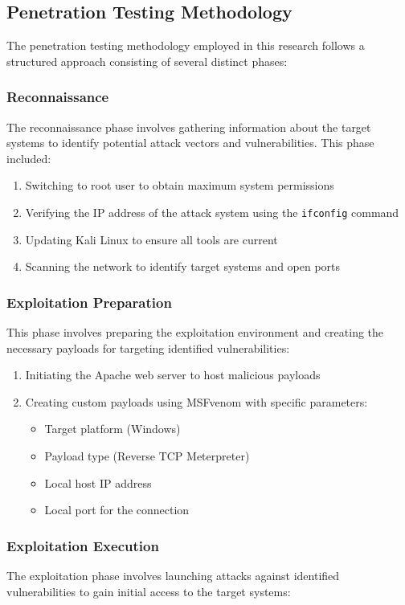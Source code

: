 \documentclass[journal,twoside]{IEEEtran}
\begin{document}
\subsection{Penetration Testing Methodology}
The penetration testing methodology employed in this research follows a structured approach consisting of several distinct phases:

\subsubsection{Reconnaissance}
The reconnaissance phase involves gathering information about the target systems to identify potential attack vectors and vulnerabilities. This phase included:

\begin{enumerate}
    \item Switching to root user to obtain maximum system permissions
    \item Verifying the IP address of the attack system using the \texttt{ifconfig} command
    \item Updating Kali Linux to ensure all tools are current
    \item Scanning the network to identify target systems and open ports
\end{enumerate}

\subsubsection{Exploitation Preparation}
This phase involves preparing the exploitation environment and creating the necessary payloads for targeting identified vulnerabilities:

\begin{enumerate}
    \item Initiating the Apache web server to host malicious payloads
    \item Creating custom payloads using MSFvenom with specific parameters:
    \begin{itemize}
        \item Target platform (Windows)
        \item Payload type (Reverse TCP Meterpreter)
        \item Local host IP address
        \item Local port for the connection
    \end{itemize}
\end{enumerate}

\subsubsection{Exploitation Execution}
The exploitation phase involves launching attacks against identified vulnerabilities to gain initial access to the target systems:
\end{document}
